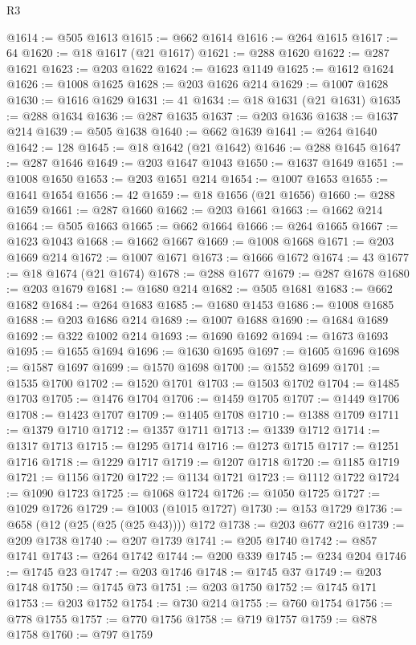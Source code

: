 \begin{lexlean}{R3}
\begin{coremodule}
@1614 := @505 @1613
@1615 := @662 @1614
@1616 := @264 @1615
@1617 := 64
@1620 := @18 @1617 (@21 @1617)
@1621 := @288 @1620
@1622 := @287 @1621
@1623 := @203 @1622
@1624 := @1623 @1149
@1625 := @1612 @1624
@1626 := @1008 @1625
@1628 := @203 @1626 @214
@1629 := @1007 @1628
@1630 := @1616 @1629
@1631 := 41
@1634 := @18 @1631 (@21 @1631)
@1635 := @288 @1634
@1636 := @287 @1635
@1637 := @203 @1636
@1638 := @1637 @214
@1639 := @505 @1638
@1640 := @662 @1639
@1641 := @264 @1640
@1642 := 128
@1645 := @18 @1642 (@21 @1642)
@1646 := @288 @1645
@1647 := @287 @1646
@1649 := @203 @1647 @1043
@1650 := @1637 @1649
@1651 := @1008 @1650
@1653 := @203 @1651 @214
@1654 := @1007 @1653
@1655 := @1641 @1654
@1656 := 42
@1659 := @18 @1656 (@21 @1656)
@1660 := @288 @1659
@1661 := @287 @1660
@1662 := @203 @1661
@1663 := @1662 @214
@1664 := @505 @1663
@1665 := @662 @1664
@1666 := @264 @1665
@1667 := @1623 @1043
@1668 := @1662 @1667
@1669 := @1008 @1668
@1671 := @203 @1669 @214
@1672 := @1007 @1671
@1673 := @1666 @1672
@1674 := 43
@1677 := @18 @1674 (@21 @1674)
@1678 := @288 @1677
@1679 := @287 @1678
@1680 := @203 @1679
@1681 := @1680 @214
@1682 := @505 @1681
@1683 := @662 @1682
@1684 := @264 @1683
@1685 := @1680 @1453
@1686 := @1008 @1685
@1688 := @203 @1686 @214
@1689 := @1007 @1688
@1690 := @1684 @1689
@1692 := @322 @1002 @214
@1693 := @1690 @1692
@1694 := @1673 @1693
@1695 := @1655 @1694
@1696 := @1630 @1695
@1697 := @1605 @1696
@1698 := @1587 @1697
@1699 := @1570 @1698
@1700 := @1552 @1699
@1701 := @1535 @1700
@1702 := @1520 @1701
@1703 := @1503 @1702
@1704 := @1485 @1703
@1705 := @1476 @1704
@1706 := @1459 @1705
@1707 := @1449 @1706
@1708 := @1423 @1707
@1709 := @1405 @1708
@1710 := @1388 @1709
@1711 := @1379 @1710
@1712 := @1357 @1711
@1713 := @1339 @1712
@1714 := @1317 @1713
@1715 := @1295 @1714
@1716 := @1273 @1715
@1717 := @1251 @1716
@1718 := @1229 @1717
@1719 := @1207 @1718
@1720 := @1185 @1719
@1721 := @1156 @1720
@1722 := @1134 @1721
@1723 := @1112 @1722
@1724 := @1090 @1723
@1725 := @1068 @1724
@1726 := @1050 @1725
@1727 := @1029 @1726
@1729 := @1003 (@1015 @1727)
@1730 := @153 @1729
@1736 := @658 (@12 (@25 (@25 (@25 @43)))) @172
@1738 := @203 @677 @216
@1739 := @209 @1738
@1740 := @207 @1739
@1741 := @205 @1740
@1742 := @857 @1741
@1743 := @264 @1742
@1744 := @200 @339
@1745 := @234 @204
@1746 := @1745 @23
@1747 := @203 @1746
@1748 := @1745 @37
@1749 := @203 @1748
@1750 := @1745 @73
@1751 := @203 @1750
@1752 := @1745 @171
@1753 := @203 @1752
@1754 := @730 @214
@1755 := @760 @1754
@1756 := @778 @1755
@1757 := @770 @1756
@1758 := @719 @1757
@1759 := @878 @1758
@1760 := @797 @1759

\end{coremodule}
\end{lexlean}
